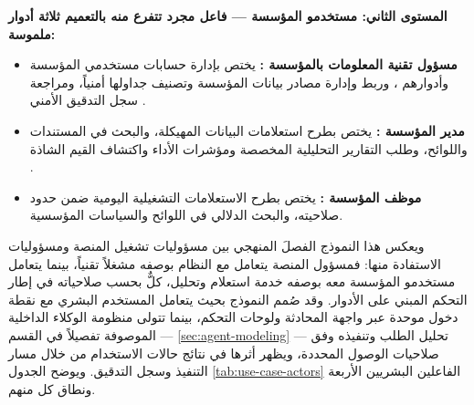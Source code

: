 \textbf{المستوى الثاني: مستخدمو المؤسسة  --- فاعل مجرد تتفرع منه بالتعميم  ثلاثة أدوار ملموسة:}

\begin{itemize}[label={\textbullet},leftmargin=*,itemsep=4pt]
  \item \textbf{مسؤول تقنية المعلومات بالمؤسسة :} يختص بإدارة حسابات مستخدمي المؤسسة وأدوارهم ، وربط وإدارة مصادر بيانات المؤسسة وتصنيف جداولها أمنياً، ومراجعة سجل التدقيق الأمني .
  \item \textbf{مدير المؤسسة :} يختص بطرح استعلامات البيانات المهيكلة، والبحث في المستندات واللوائح، وطلب التقارير التحليلية المخصصة ومؤشرات الأداء واكتشاف القيم الشاذة .
  \item \textbf{موظف المؤسسة :} يختص بطرح الاستعلامات التشغيلية اليومية ضمن حدود صلاحيته، والبحث الدلالي في اللوائح والسياسات المؤسسية.
\end{itemize}

ويعكس هذا النموذج الفصلَ المنهجي بين مسؤوليات تشغيل المنصة ومسؤوليات الاستفادة منها: فمسؤول المنصة يتعامل مع النظام بوصفه مشغلاً تقنياً، بينما يتعامل مستخدمو المؤسسة معه بوصفه خدمة استعلام وتحليل، كلٌّ بحسب صلاحياته في إطار التحكم المبني على الأدوار. وقد صُمم النموذج بحيث يتعامل المستخدم البشري مع نقطة دخول موحدة عبر واجهة المحادثة ولوحات التحكم، بينما تتولى منظومة الوكلاء الداخلية --- الموصوفة تفصيلاً في القسم \ref{sec:agent-modeling} --- تحليل الطلب وتنفيذه وفق صلاحيات الوصول المحددة، ويظهر أثرها في نتائج حالات الاستخدام من خلال مسار التنفيذ  وسجل التدقيق. ويوضح الجدول \ref{tab:use-case-actors} الفاعلين البشريين الأربعة ونطاق كل منهم.

